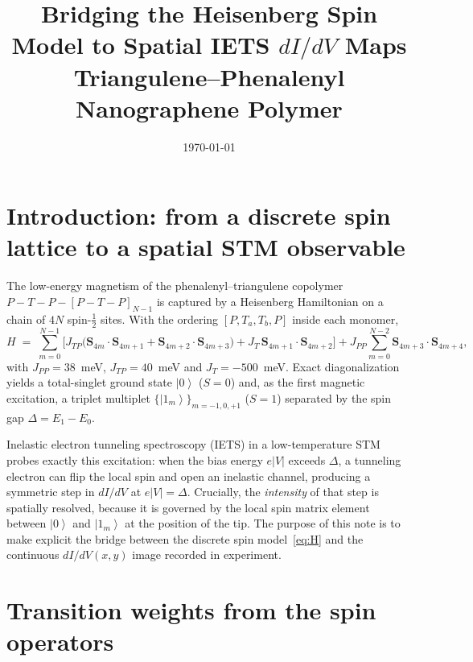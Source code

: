 \documentclass[11pt,a4paper]{article}
\title{Bridging the Heisenberg Spin Model to Spatial IETS $dI/dV$ Maps\\
\large Triangulene--Phenalenyl Nanographene Polymer}
\author{}
\date{\today}
\newcommand{\ket}[1]{\left|#1\right\rangle}
\renewcommand{\vec}[1]{\mathbf{#1}}
\begin{document}
\maketitle

\section{Introduction: from a discrete spin lattice to a spatial STM observable}

The low-energy magnetism of the phenalenyl--triangulene copolymer
$P\!-\!T\!-\!P\!-\![P\!-\!T\!-\!P]_{N-1}$ is captured by a Heisenberg Hamiltonian on
a chain of $4N$ spin-$\tfrac12$ sites. With the ordering $[P,T_a,T_b,P]$ inside
each monomer,
\begin{equation}
  H \;=\;
  \sum_{m=0}^{N-1}\!\Big[
      J_{TP}\big(\vec S_{4m}\!\cdot\!\vec S_{4m+1}
               +\vec S_{4m+2}\!\cdot\!\vec S_{4m+3}\big)
    + J_{T}\,\vec S_{4m+1}\!\cdot\!\vec S_{4m+2}\Big]
  + J_{PP}\!\sum_{m=0}^{N-2}\! \vec S_{4m+3}\!\cdot\!\vec S_{4m+4},
  \label{eq:H}
\end{equation}
with $J_{PP}=38$~meV, $J_{TP}=40$~meV and $J_{T}=-500$~meV. Exact
diagonalization yields a total-singlet ground state $\ket{0}$ ($S=0$) and, as the
first magnetic excitation, a triplet multiplet $\{\ket{1_m}\}_{m=-1,0,+1}$ ($S=1$)
separated by the spin gap $\Delta=E_1-E_0$.

Inelastic electron tunneling spectroscopy (IETS) in a low-temperature STM probes
exactly this excitation: when the bias energy $e|V|$ exceeds $\Delta$, a tunneling
electron can flip the local spin and open an inelastic channel, producing a
symmetric step in $dI/dV$ at $e|V|=\Delta$. Crucially, the \emph{intensity} of
that step is spatially resolved, because it is governed by the local spin
matrix element between $\ket{0}$ and $\ket{1_m}$ at the position of the tip. The
purpose of this note is to make explicit the bridge between the discrete spin
model~\eqref{eq:H} and the continuous $dI/dV(x,y)$ image recorded in experiment.

\section{Transition weights from the spin operators}
\end{document}
